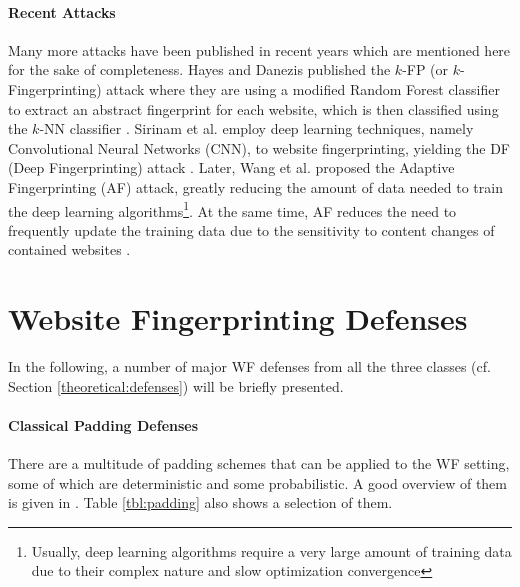 \documentclass[
	ruledheaders=chapter,
	class=report,
	thesis={type=master, department=inf},
	accentcolor=1c,
	custommargins=true,
	marginpar=false,
	parskip=half-,
	fontsize=11pt,
]{tudapub}
\begin{document}
	\paragraph{Recent Attacks} Many more attacks have been published in recent years which are mentioned here for the sake of completeness. Hayes and Danezis published the $k$-FP (or $k$-Fingerprinting) attack where they are using a modified Random Forest classifier to extract an abstract fingerprint for each website, which is then classified using the $k$-NN classifier \cite{Hayes2016}. Sirinam et al. employ deep learning techniques, namely Convolutional Neural Networks (CNN), to website fingerprinting, yielding the DF (Deep Fingerprinting) attack \cite{Sirinam2018}. Later, Wang et al. proposed the Adaptive Fingerprinting (AF) attack, greatly reducing the amount of data needed to train the deep learning algorithms\footnote{Usually, deep learning algorithms require a very large amount of training data due to their complex nature and slow optimization convergence}. At the same time, AF reduces the need to frequently update the training data due to the sensitivity to content changes of contained websites \cite{Wang2021}.
	
	\section{Website Fingerprinting Defenses}
	\label{prior:defenses}
	
	In the following, a number of major WF defenses from all the three classes (cf. Section \ref{theoretical:defenses}) will be briefly presented.
	
	\paragraph{Classical Padding Defenses} There are a multitude of padding schemes that can be applied to the WF setting, some of which are deterministic and some probabilistic. A good overview of them is given in \cite{Dyer2012}. Table \ref{tbl:padding} also shows a selection of them.
	
\end{document}
